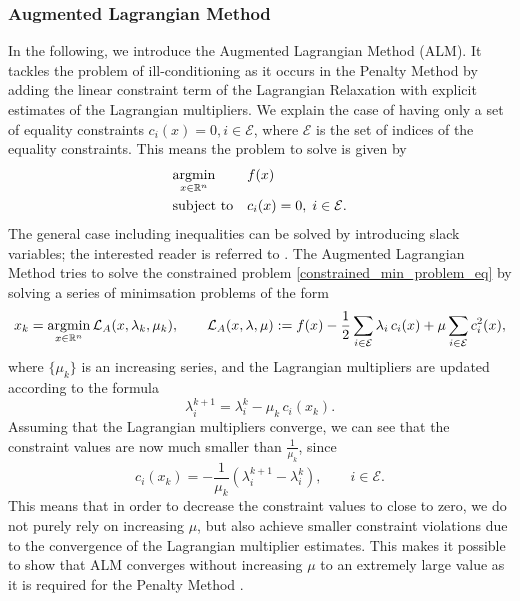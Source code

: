 \subsubsection{Augmented Lagrangian Method}
In the following, we introduce the Augmented Lagrangian Method (ALM). It tackles the problem of ill-conditioning as it occurs in the Penalty Method by adding the linear constraint term of the Lagrangian Relaxation with explicit estimates of the Lagrangian multipliers. We explain the case of having only a set of equality constraints $c_i(x) = 0, i \in \mathcal{E}$, where $\mathcal{E}$ is the set of indices of the equality constraints. This means the problem to solve is given by 
\begin{equation}
\label{constrained_min_problem_eq}
\begin{aligned}
& \underset{x \in \mathbb{R}^n}{\operatorname*{argmin}}
& & f(x) \\
& \text{subject to}
& & c_i(x) = 0, \; i \in \mathcal{E}.
\end{aligned}
\end{equation}
The general case including inequalities can be solved by introducing slack variables; the interested reader is referred to \cite{NoceWrig06}.
The Augmented Lagrangian Method tries to solve the constrained problem \eqref{constrained_min_problem_eq} by solving a series of minimsation problems of the form
\[x_k = \operatorname*{argmin}_{x \in \mathbb{R}^n} \mathcal{L}_A(x, \lambda_k, \mu_k), \qquad \mathcal{L}_A(x, \lambda, \mu) := f(x) - \frac{1}{2}\sum_{i \in \mathcal{E}} \lambda_i \,c_i(x) + \mu \sum_{i \in \mathcal{E}} c_i^2(x),\]
where $\{\mu_k\}$ is an increasing series, and the Lagrangian multipliers are updated according to the formula
\begin{equation}
\lambda_i^{k+1} = \lambda_i^k - \mu_k\,c_i(x_k).
\label{eq:alm_update}
\end{equation}
Assuming that the Lagrangian multipliers converge, we can see that the constraint values are now much smaller than $\frac{1}{\mu_k}$, since 
\[ c_i(x_k) = -\frac{1}{\mu_k}(\lambda_i^{k+1} - \lambda_i^k), \qquad i\in \mathcal{E}. \]
This means that in order to decrease the constraint values to close to zero, we do not purely rely on increasing $\mu$, but also achieve smaller constraint violations due to the convergence of the Lagrangian multiplier estimates. This makes it possible to show that ALM converges without increasing $\mu$ to an extremely large value as it is required for the Penalty Method \cite{NoceWrig06}.


